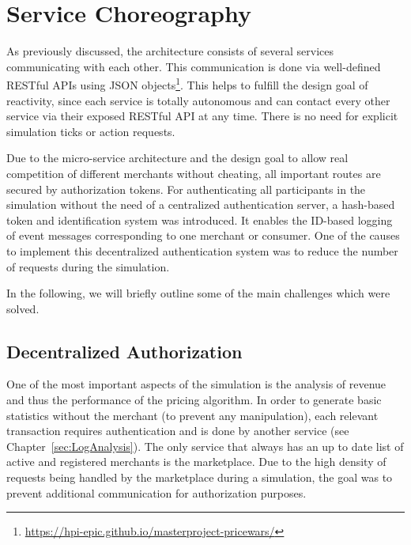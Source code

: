 %
\section{Service Choreography}
\label{sec:Choreography}
%
As previously discussed, the architecture consists of several services communicating with each other. This communication is done via well-defined RESTful APIs using JSON objects\footnote{\url{https://hpi-epic.github.io/masterproject-pricewars/}}. This helps to fulfill the design goal of reactivity, since each service is totally autonomous and can contact every other service via their exposed RESTful API at any time. There is no need for explicit simulation ticks or action requests.

Due to the micro-service architecture and the design goal to allow real competition of different merchants without cheating, all important routes are secured by authorization tokens. For authenticating all participants in the simulation without the need of a centralized authentication server, a hash-based token and identification system was introduced. It enables the ID-based logging of event messages corresponding to one merchant or consumer. One of the causes to implement this decentralized authentication system was to reduce the number of requests during the simulation.


In the following, we will briefly outline some of the main challenges which were solved.

%
\subsection{Decentralized Authorization}
\label{sec:DecentralizedAuthorization}
%
One of the most important aspects of the simulation is the analysis of revenue and thus the performance of the pricing algorithm. In order to generate basic statistics without the merchant (to prevent any manipulation), each relevant transaction requires authentication and is done by another service (see Chapter~\ref{sec:LogAnalysis}). The only service that always has an up to date list of active and registered merchants is the marketplace. Due to the high density of requests being handled by the marketplace during a simulation, the goal was to prevent additional communication for authorization purposes. 

